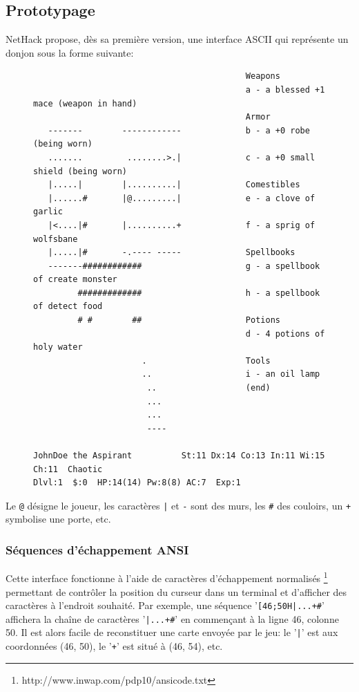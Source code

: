 \documentclass[a4paper,12pt]{article}
\begin{document}
\subsection{Prototypage}

NetHack propose, dès sa première version, une interface ASCII qui représente
un donjon sous la forme suivante:

\begin{figure}[H]
\begin{verbatim}
                                           Weapons
                                           a - a blessed +1 mace (weapon in hand)
                                           Armor
   -------        ------------             b - a +0 robe (being worn)
   .......         ........>.|             c - a +0 small shield (being worn)
   |.....|        |..........|             Comestibles
   |......#       |@.........|             e - a clove of garlic
   |<....|#       |..........+             f - a sprig of wolfsbane
   |.....|#       -.---- -----             Spellbooks
   -------############                     g - a spellbook of create monster
         #############                     h - a spellbook of detect food
         # #        ##                     Potions
                                           d - 4 potions of holy water
                      .                    Tools
                      ..                   i - an oil lamp
                       ..                  (end) 
                       ...
                       ...
                       ----

JohnDoe the Aspirant          St:11 Dx:14 Co:13 In:11 Wi:15 Ch:11  Chaotic
Dlvl:1  $:0  HP:14(14) Pw:8(8) AC:7  Exp:1
\end{verbatim}
\end{figure}

Le \verb!@! désigne le joueur, les caractères \verb!|! et \verb!-! sont des
murs, les \verb!#! des couloirs, un \verb!+! symbolise une porte, etc.


\subsubsection*{Séquences d'échappement ANSI}

Cette interface fonctionne à l'aide de caractères d'échappement normalisés
\footnote{http://www.inwap.com/pdp10/ansicode.txt} permettant de contrôler la
position du curseur dans un terminal et d'afficher des caractères à l'endroit
souhaité. Par exemple, une séquence '\verb![46;50H|...+#!' affichera la chaîne
de caractères '\verb!|...+#!' en commençant à la ligne 46, colonne 50. Il est
alors facile de reconstituer une carte envoyée par le jeu: le '\verb!|!' est
aux coordonnées (46, 50), le '\verb!+!' est situé à (46, 54), etc.
	
\end{document}
